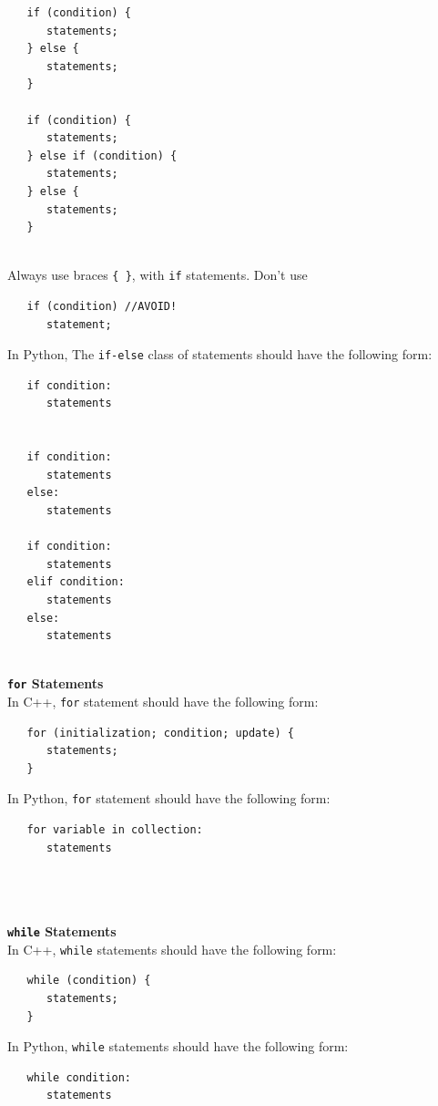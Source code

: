 \documentclass{CSSRforAfrica}
\newcommand{\blank}{~\\}
\begin{document}
\begin{appendices}
{\begin{verbatim}
   if (condition) {
      statements;
   } else {
      statements;
   }

   if (condition) {
      statements;
   } else if (condition) {
      statements;
   } else {
      statements;
   }
\end{verbatim}
}
\blank
Always use   braces {\small \verb+{ }+},  with {\small \verb+if+} statements. 
Don't use
{\small
\begin{verbatim}
   if (condition) //AVOID!  
      statement;
\end{verbatim}
}
\noindent
In Python,
The {\small \verb+if-else+} class of statements should have the following form:
{\small
\begin{verbatim}
   if condition:
      statements
  

   if condition:
      statements
   else:
      statements

   if condition:
      statements
   elif condition:
      statements
   else:
      statements

\end{verbatim}
}
\blank
{\bf  {\tt for} Statements}\\
In C++,   {\small \verb+for+} statement should have the following form:
{\small
\begin{verbatim}
   for (initialization; condition; update) {
      statements;
   }
\end{verbatim}
}

\noindent
In Python,   {\small \verb+for+} statement should have the following form:
{\small
\begin{verbatim}
   for variable in collection:
      statements
   
\end{verbatim}
}
\blank
~
\blank
{\bf  {\tt while} Statements}\\
In C++, {\small \verb+while+} statements should have the following form:
{\small
\begin{verbatim}
   while (condition) {
      statements;
   } 
\end{verbatim}
}

\noindent
In Python, {\small \verb+while+} statements should have the following form:
{\small
\begin{verbatim}
   while condition: 
      statements
 

\end{verbatim}}
\end{appendices}
\end{document}

